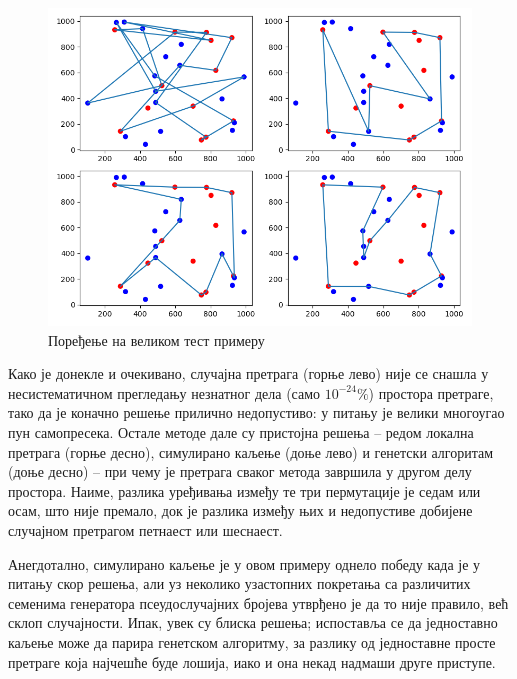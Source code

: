 \documentclass[a4paper]{article}
\begin{document}
\begin{figure}[h!]
\begin{center}
\includegraphics[scale=0.55]{poredjenje30.png}
\end{center}
\caption{Поређење на великом тест примеру}
\label{poredjenje30}
\end{figure}

Како је донекле и очекивано, случајна претрага (горње лево) није се снашла у несистематичном прегледању незнатног дела (само $10^{-24}\%$) простора претраге, тако да је коначно решење прилично недопустиво: у питању је велики многоугао пун самопресека. Остале методе дале су пристојна решења -- редом локална претрага (горње десно), симулирано каљење (доње лево) и генетски алгоритам (доње десно) -- при чему је претрага сваког метода завршила у другом делу простора. Наиме, разлика уређивања између те три пермутације је седам или осам, што није премало, док је разлика између њих и недопустиве добијене случајном претрагом петнаест или шеснаест.

Анегдотално, симулирано каљење је у овом примеру однело победу када је у питању скор решења, али уз неколико узастопних покретања са различитих семенима генератора псеудослучајних бројева утврђено је да то није правило, већ склоп случајности. Ипак, увек су блиска решења; испоставља се да једноставно каљење може да парира генетском алгоритму, за разлику од једноставне просте претраге која најчешће буде лошија, иако и она некад надмаши друге приступе.
\end{document}
